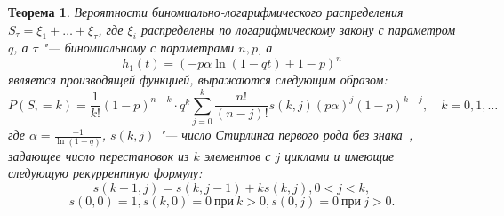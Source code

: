\documentclass[12pt, specialist, subf, substylefile = spbu_report.rtx]{disser}
\newtheorem{theorem}{Теорема}
\begin{document}
	\begin{theorem}
		Вероятности биномиально-логарифмического распределения $S _\tau = \xi _1 + \dots + \xi _\tau$, где $\xi _i$ распределены по логарифмическому закону с параметром $q$, а $\tau$ "--- биномиальному с параметрами $n, p$, а
		\[
			h _1(t) = \left(-p \alpha \ln (1 - qt) + 1 - p\right) ^n
		\]
		является производящей функцией, выражаются следующим образом:
		\label{theorem:probBLR}
		\begin{equation} \label{eq:probBLR}
			P(S _\tau = k) = \frac 1 {k!} (1 - p) ^{n - k} \cdot q ^k \sum \limits ^{k} _{j = 0} \frac {n!} {(n - j)!} s(k, j) (p \alpha) ^j (1 - p) ^{k - j},\quad k = 0, 1, \dots
		\end{equation}
		где $ \alpha = \frac {-1} {\ln(1 - q)} $, $ s(k, j) $ "--- число Стирлинга первого рода без знака~\cite{bib:knuth1998}, задающее число перестановок из $ k $ элементов с $ j $ циклами и имеющие следующую рекуррентную формулу:
		\[
			s(k + 1, j) = s(k, j - 1) + k s(k, j), 0 < j < k,
		\]
		\[
			s(0, 0) = 1, s(k, 0) = 0~\text{при}~ k > 0, s(0, j) = 0~\text{при}~ j > 0.
		\]
	\end{theorem}
\end{document}
